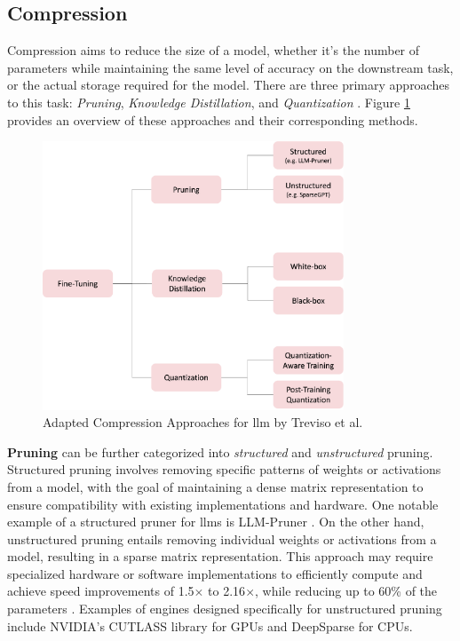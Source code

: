 \subsection{Compression}
\label{subsec:llm_compression}

Compression aims to reduce the size of a model, whether it's the number of parameters while maintaining the same level of accuracy on the downstream task, or the actual storage required for the model. There are three primary approaches to this task: \textit{Pruning}, \textit{Knowledge Distillation}, and \textit{Quantization} \cite{treviso_efficient_2023, zhu_survey_2023}. Figure \ref{fig:llm_compression} provides an overview of these approaches and their corresponding methods.

\begin{figure}[h]
    \centering
    \includegraphics[width=0.8\textwidth]{Grafiken/compression_approaches.png}
    \caption{Adapted Compression Approaches for \gls{llm} by Treviso et al. \cite{treviso_efficient_2023}}
    \label{fig:llm_compression}
\end{figure}

\textbf{Pruning} can be further categorized into \textit{structured} and \textit{unstructured} pruning. Structured pruning involves removing specific patterns of weights or activations from a model, with the goal of maintaining a dense matrix representation to ensure compatibility with existing implementations and hardware. One notable example of a structured pruner for \gls{llm}s is LLM-Pruner \cite{ma_llm-pruner_2023}. On the other hand, unstructured pruning entails removing individual weights or activations from a model, resulting in a sparse matrix representation. This approach may require specialized hardware or software implementations to efficiently compute and achieve speed improvements of 1.5$\times$ to 2.16$\times$, while reducing up to 60\% of the parameters \cite{frantar_sparsegpt_2023}. Examples of engines designed specifically for unstructured pruning include NVIDIA's CUTLASS library for GPUs \cite{frantar_sparsegpt_2023} and DeepSparse \cite{noauthor_deepsparse_2023} for CPUs.

